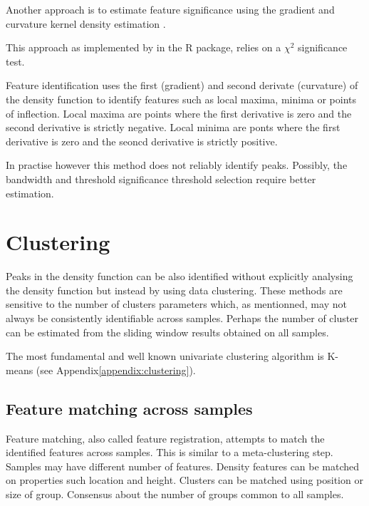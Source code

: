 Another approach is to estimate feature significance using the gradient and curvature kernel density estimation \citep{Chaudhuri:1999gu,Duong:2008eu}.

This approach as implemented by  in the  R package, relies on a $\chi^2$ significance test.

Feature identification uses the first (gradient) and second derivate (curvature) of the density function to identify features such as local maxima, minima or points of inflection.
Local maxima are points where the first derivative is zero and the second derivative is strictly negative.
Local minima are ponts where the first derivative is zero and the seoncd derivative is strictly positive.

In practise however this method does not reliably identify peaks.
Possibly, the bandwidth and threshold significance threshold selection require better estimation.


\section{Clustering}
Peaks in the density function can be also identified without explicitly analysing the density function but instead by using data clustering.
These methods are sensitive to the number of clusters parameters which, as mentionned, may not always be consistently identifiable across samples.
Perhaps the number of cluster can be estimated from the sliding window results obtained on all samples.

The most fundamental and well known univariate clustering algorithm is K-means (see Appendix\ref{appendix:clustering}).


\subsection{Feature matching across samples }

Feature matching, also called feature registration, attempts to match the identified features across samples.
This is similar to a meta-clustering step.
Samples may have different number of features.
Density features can be matched on properties such location and height.
Clusters can be matched using position or size of group.
Consensus about the number of groups common to all samples.


